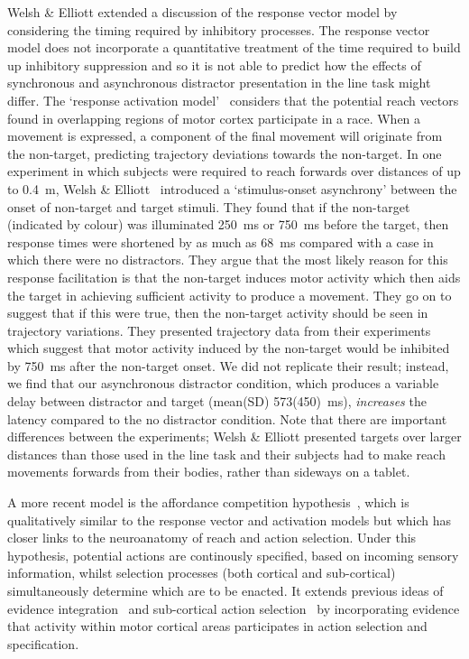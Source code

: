 \documentclass[10pt,letterpaper]{article}
\begin{document}
Welsh \& Elliott extended a discussion of the response vector model by
considering the timing required by inhibitory processes. The response
vector model does not incorporate a quantitative treatment of the time
required to build up inhibitory suppression and so it is not able to
predict how the effects of synchronous and asynchronous distractor
presentation in the line task might differ. The `response activation
model'~\cite{welsh_movement_2004} considers that the potential reach
vectors found in overlapping regions of motor cortex participate in a
race. When a movement is expressed, a component of the final movement
will originate from the non-target, predicting trajectory deviations
towards the non-target.  In one experiment in which subjects were
required to reach forwards over distances of up to 0.4~m, Welsh \&
Elliott~\cite{welsh_movement_2004} introduced a `stimulus-onset
asynchrony' between the onset of non-target and target stimuli. They
found that if the non-target (indicated by colour) was illuminated
250~ms or 750~ms before the target, then response times were shortened
by as much as 68~ms compared with a case in which there were no
distractors. They argue that the most likely reason for this response
facilitation is that the non-target induces motor activity which then
aids the target in achieving sufficient activity to produce a
movement. They go on to suggest that if this were true, then the
non-target activity should be seen in trajectory variations. They
presented trajectory data from their experiments which suggest that
motor activity induced by the non-target would be inhibited by 750~ms
after the non-target onset. We did not replicate their result; instead,
we find that our asynchronous distractor condition, which produces a
variable delay between distractor and target (mean(SD) 573(450)~ms),
\emph{increases} the latency compared to the no distractor
condition. Note that there are important differences between the
experiments; Welsh \& Elliott presented targets over larger distances
than those used in the line task and their subjects had to make reach
movements forwards from their bodies, rather than sideways on a
tablet.

A more recent model is the affordance competition
hypothesis~\cite{cisek_cortical_2007}, which is qualitatively similar
to the response vector and activation models but which has closer
links to the neuroanatomy of reach and action selection. Under this
hypothesis, potential actions are continously specified, based on
incoming sensory information, whilst selection processes (both
cortical and sub-cortical) simultaneously determine which are to be
enacted. It extends previous ideas of evidence
integration~\cite{mazurek_role_2003,bogacz_physics_2006} and
sub-cortical action
selection~\cite{redgrave_basal_1999,grillner_mechanisms_2005,houk_action_2007}
by incorporating evidence that activity within motor cortical areas
participates in action selection and specification.
\end{document}
